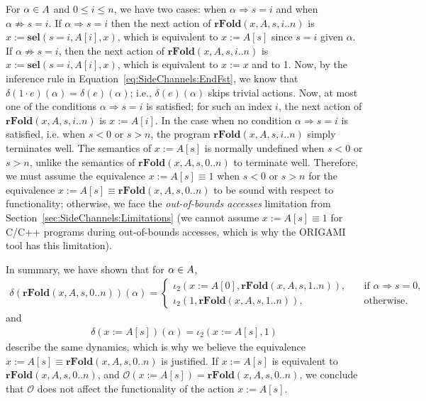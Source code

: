 For $\alpha \in A$ and $0\leq i\leq n$, we have two cases: when $\alpha \Rightarrow s=i$ and when $\alpha \not\Rightarrow s=i$. If $\alpha \Rightarrow s=i$ then the next action of $\textbf{rFold}(x,A,s,i..n)$ is $x:=\textbf{sel}(s=i,A[i],x)$, which is equivalent to $x:=A[s]$ since $s=i$ given $\alpha$. If $\alpha \not \Rightarrow s=i$, then the next action of $\textbf{rFold}(x,A,s,i..n)$ is $x:=\textbf{sel}(s=i,A[i],x)$, which is equivalent to $x:=x$ and to 1. Now, by the inference rule in Equation~\ref{eq:SideChannels:EndFst}, we know that $\delta(1\cdot e)(\alpha)=\delta(e)(\alpha)$; i.e., $\delta(e)(\alpha)$ skips trivial actions. Now, at most one of the conditions $\alpha \Rightarrow s=i$ is satisfied; for such an index $i$, the next action of $\textbf{rFold}(x,A,s,i..n)$ is $x:=A[i]$. In the case when no condition $\alpha \Rightarrow s=i$ is satisfied, i.e. when $s<0$ or $s>n$, the program $\textbf{rFold}(x,A,s,i..n)$ simply terminates well. The semantics of $x:=A[s]$ is normally undefined when $s<0$ or $s>n$, unlike the semantics of $\textbf{rFold}(x,A,s,0..n)$ to terminate well. Therefore, we must assume the equivalence $x:=A[s]\equiv 1$ when $s<0$ or $s>n$ for the equivalence $x:=A[s]\equiv \textbf{rFold}(x,A,s,0..n)$ to be sound with respect to functionality; otherwise, we face the \emph{out-of-bounds accesses} limitation from Section~\ref{sec:SideChannels:Limitations} (we cannot assume $x:=A[s]\equiv 1$ for C/C++ programs during out-of-bounds accesses, which is why the ORIGAMI tool has this limitation).

In summary, we have shown that for $\alpha \in A$, 
\begin{align*}
    \delta(\textbf{rFold}(x,A,s,0..n))(\alpha)=
    \begin{cases}
        \iota_2(x:=A[0],\textbf{rFold}(x,A,s,1..n)),&\quad\text{if $\alpha \Rightarrow s=0$},\\
        \iota_2(1,\textbf{rFold}(x,A,s,1..n)),&\quad\text{otherwise}.
    \end{cases}
\end{align*}
and
\begin{align*}
    \delta(x:=A[s])(\alpha)= \iota_2(x:=A[s],1)
\end{align*}
describe the same dynamics, which is why we believe the equivalence $x:=A[s]\equiv \textbf{rFold}(x,A,s,0..n)$ is justified. If $x:=A[s]$ is equivalent to $\textbf{rFold}(x,A,s,0..n)$, and $\mathscr{O}(x:=A[s])=\textbf{rFold}(x,A,s,0..n)$, we conclude that $\mathscr{O}$ does not affect the functionality of the action $x:=A[s]$.


